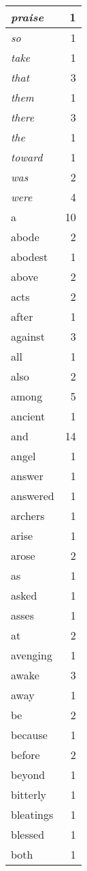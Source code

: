 \begin{center}
\begin{longtable}{l|r}
\emph{praise} & 1\\ \hline 
\emph{so} & 1\\ \hline 
\emph{take} & 1\\ \hline 
\emph{that} & 3\\ \hline 
\emph{them} & 1\\ \hline 
\emph{there} & 3\\ \hline 
\emph{the} & 1\\ \hline 
\emph{toward} & 1\\ \hline 
\emph{was} & 2\\ \hline 
\emph{were} & 4\\ \hline 
a & 10\\ \hline 
abode & 2\\ \hline 
abodest & 1\\ \hline 
above & 2\\ \hline 
acts & 2\\ \hline 
after & 1\\ \hline 
against & 3\\ \hline 
all & 1\\ \hline 
also & 2\\ \hline 
among & 5\\ \hline 
ancient & 1\\ \hline 
and & 14\\ \hline 
angel & 1\\ \hline 
answer & 1\\ \hline 
answered & 1\\ \hline 
archers & 1\\ \hline 
arise & 1\\ \hline 
arose & 2\\ \hline 
as & 1\\ \hline 
asked & 1\\ \hline 
asses & 1\\ \hline 
at & 2\\ \hline 
avenging & 1\\ \hline 
awake & 3\\ \hline 
away & 1\\ \hline 
be & 2\\ \hline 
because & 1\\ \hline 
before & 2\\ \hline 
beyond & 1\\ \hline 
bitterly & 1\\ \hline 
bleatings & 1\\ \hline 
blessed & 1\\ \hline 
both & 1\\ \hline 

\end{longtable}
\end{center}
